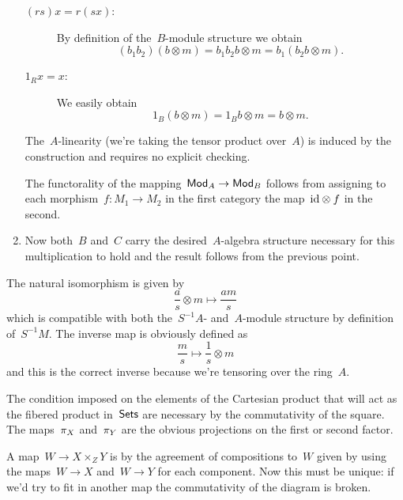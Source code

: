 \begin{exercise}
\begin{enumerate}
\begin{description}
        \item[$(rs)x=r(sx)$:] By definition of the~$B$\nobreakdash-module structure we obtain
          \begin{equation}
            (b_1b_2)(b\otimes m)=b_1b_2b\otimes m=b_1(b_2b\otimes m).
          \end{equation}

        \item[$1_Rx=x$:] We easily obtain
          \begin{equation}
            1_B(b\otimes m)=1_Bb\otimes m=b\otimes m.
          \end{equation}
      \end{description}

      The~$A$\nobreakdash-linearity (we're taking the tensor product over~$A$) is induced by the construction and requires no explicit checking.

      The functorality of the mapping~$\mathsf{Mod}_A\to\mathsf{Mod}_B$ follows from assigning to each morphism~$f\colon M_1\to M_2$ in the first category the map~$\mathrm{id}\otimes f$ in the second.

    \item Now both~$B$ and~$C$ carry the desired~$A$\nobreakdash-algebra structure necessary for this multiplication to hold and the result follows from the previous point.
  \end{enumerate}
\end{exercise}

\begin{exercise}
  The natural isomorphism is given by
  \begin{equation}
    \frac{a}{s}\otimes m\mapsto \frac{am}{s}
  \end{equation}
  which is compatible with both the~$S^{-1}A$- and~$A$\nobreakdash-module structure by definition of~$S^{-1}M$. The inverse map is obviously defined as
  \begin{equation}
    \frac{m}{s}\mapsto \frac{1}{s}\otimes m
  \end{equation}
  and this is the correct inverse because we're tensoring over the ring~$A$.
\end{exercise}

\begin{exercise}
  The condition imposed on the elements of the Cartesian product that will act as the fibered product in~$\mathsf{Sets}$ are necessary by the commutativity of the square. The maps~$\pi_X$ and~$\pi_Y$ are the obvious projections on the first or second factor.

  A map~$W\to X\times_Z Y$ is by the agreement of compositions to~$W$ given by using the maps~$W\to X$ and~$W\to Y$ for each component. Now this must be unique: if we'd try to fit in another map the commutativity of the diagram is broken.
\end{exercise}

